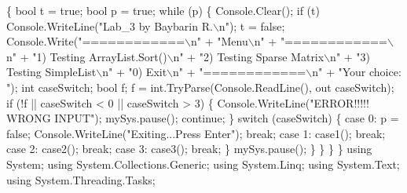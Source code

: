\begin{DoxyCode}
        \{
            \textcolor{keywordtype}{bool} t = \textcolor{keyword}{true};
            \textcolor{keywordtype}{bool} p = \textcolor{keyword}{true};
            \textcolor{keywordflow}{while} (p)
            \{
                Console.Clear();
                \textcolor{keywordflow}{if} (t) Console.WriteLine(\textcolor{stringliteral}{"Lab\_3 by Baybarin R.\(\backslash\)n"});
                t = \textcolor{keyword}{false};
                Console.Write(\textcolor{stringliteral}{"============\(\backslash\)n"} +
                              \textcolor{stringliteral}{"Menu\(\backslash\)n"} +
                              \textcolor{stringliteral}{"============\(\backslash\)n"} +
                              \textcolor{stringliteral}{"1) Testing ArrayList.Sort()\(\backslash\)n"} +
                              \textcolor{stringliteral}{"2) Testing Sparse Matrix\(\backslash\)n"} +
                              \textcolor{stringliteral}{"3) Testing SimpleList\(\backslash\)n"} +
                              \textcolor{stringliteral}{"0) Exit\(\backslash\)n"} +
                              \textcolor{stringliteral}{"============\(\backslash\)n"} +
                              \textcolor{stringliteral}{"Your choice: "});
                \textcolor{keywordtype}{int} caseSwitch;
                \textcolor{keywordtype}{bool} f;
                f = \textcolor{keywordtype}{int}.TryParse(Console.ReadLine(), out caseSwitch);
                \textcolor{keywordflow}{if} (!f || caseSwitch < 0 || caseSwitch > 3)
                \{
                    Console.WriteLine(\textcolor{stringliteral}{"ERROR!!!!! WRONG INPUT"});
                    mySys.pause();
                    \textcolor{keywordflow}{continue};
                \}
                \textcolor{keywordflow}{switch} (caseSwitch)
                \{
                    \textcolor{keywordflow}{case} 0:
                        p = \textcolor{keyword}{false};
                        Console.WriteLine(\textcolor{stringliteral}{"Exiting...Press Enter"});
                        \textcolor{keywordflow}{break};
                    \textcolor{keywordflow}{case} 1: case1();
                        \textcolor{keywordflow}{break};
                    \textcolor{keywordflow}{case} 2: case2();
                        \textcolor{keywordflow}{break};
                    \textcolor{keywordflow}{case} 3: case3();
                        \textcolor{keywordflow}{break};
                \}
                mySys.pause();
            \}
        \}
    \}
\}
﻿using System;
\textcolor{keyword}{using} System.Collections.Generic;
\textcolor{keyword}{using} System.Linq;
\textcolor{keyword}{using} System.Text;
\textcolor{keyword}{using} System.Threading.Tasks;


\end{DoxyCode}
